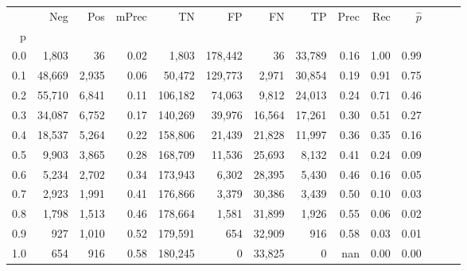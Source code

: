 \begin{tabular}{rrrrrrrrrrrrrr}
\toprule
{} &     Neg &    Pos & mPrec &       TN &       FP &      FN &      TP &  Prec &   Rec & $\hat{p}$ \\
p   &         &        &       &          &          &         &         &       &       &           \\
\midrule
0.0 &   1,803 &     36 &  0.02 &    1,803 &  178,442 &      36 &  33,789 &  0.16 &  1.00 &      0.99 \\
0.1 &  48,669 &  2,935 &  0.06 &   50,472 &  129,773 &   2,971 &  30,854 &  0.19 &  0.91 &      0.75 \\
0.2 &  55,710 &  6,841 &  0.11 &  106,182 &   74,063 &   9,812 &  24,013 &  0.24 &  0.71 &      0.46 \\
0.3 &  34,087 &  6,752 &  0.17 &  140,269 &   39,976 &  16,564 &  17,261 &  0.30 &  0.51 &      0.27 \\
0.4 &  18,537 &  5,264 &  0.22 &  158,806 &   21,439 &  21,828 &  11,997 &  0.36 &  0.35 &      0.16 \\
0.5 &   9,903 &  3,865 &  0.28 &  168,709 &   11,536 &  25,693 &   8,132 &  0.41 &  0.24 &      0.09 \\
0.6 &   5,234 &  2,702 &  0.34 &  173,943 &    6,302 &  28,395 &   5,430 &  0.46 &  0.16 &      0.05 \\
0.7 &   2,923 &  1,991 &  0.41 &  176,866 &    3,379 &  30,386 &   3,439 &  0.50 &  0.10 &      0.03 \\
0.8 &   1,798 &  1,513 &  0.46 &  178,664 &    1,581 &  31,899 &   1,926 &  0.55 &  0.06 &      0.02 \\
0.9 &     927 &  1,010 &  0.52 &  179,591 &      654 &  32,909 &     916 &  0.58 &  0.03 &      0.01 \\
1.0 &     654 &    916 &  0.58 &  180,245 &        0 &  33,825 &       0 &   nan &  0.00 &      0.00 \\
\bottomrule
\end{tabular}
